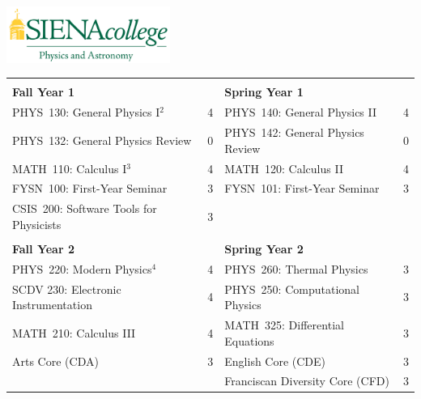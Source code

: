 \documentclass[12pt]{article}
\begin{document}
\hfill \includegraphics[width=0.40\textwidth]{siena_phys_astro_print_crop.jpg}

\vspace{0.7cm}
\vspace{0.3cm}

\vspace*{-5mm}
\begin{table}[h!]
\begin{center}
{\renewcommand{\arraystretch}{1.2}
\begin{tabular*}{0.9\textwidth}{@{\extracolsep{\fill}}lclc}
 & \\
{\Large \textbf{Fall Year 1}} & & {\Large \textbf{Spring Year 1}} & \\
\hline
PHYS~130: General Physics I$^{2}$  & 4 & PHYS~140: General Physics II     & 4 \\
PHYS~132: General Physics Review  & 0 & PHYS~142: General Physics Review & 0\\
MATH~110: Calculus I$^{3}$        & 4 & MATH~120: Calculus II            & 4 \\
FYSN~100: First-Year Seminar      & 3 & FYSN~101: First-Year Seminar     & 3\\
CSIS~200: Software Tools for Physicists & 3                              & \\ 

 & \\
{\Large \textbf{Fall Year 2}} & & {\Large \textbf{Spring Year 2}} & \\
\hline
PHYS~220: Modern Physics$^{4}$      & 4 & PHYS~260: Thermal Physics        & 3 \\
SCDV 230: Electronic Instrumentation & 4 & PHYS~250: Computational Physics  & 3  \\
MATH~210: Calculus III               & 4 & MATH~325: Differential Equations & 3 \\
Arts Core (CDA)                      & 3 & English Core (CDE)               & 3 \\
                                     &   & Franciscan Diversity Core (CFD)  & 3 \\


\end{tabular*}}
\end{center}
\end{table}
\end{document}
